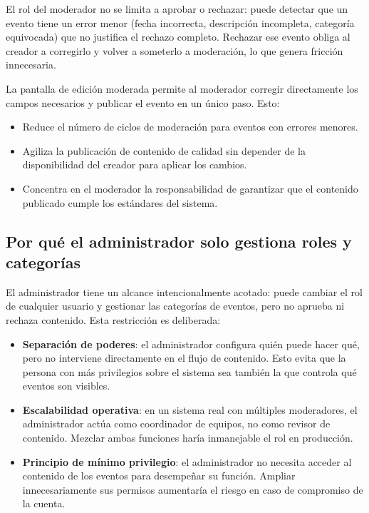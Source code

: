 El rol del moderador no se limita a aprobar o rechazar: puede detectar que un evento tiene un error menor (fecha incorrecta, descripción incompleta, categoría equivocada) que no justifica el rechazo completo. Rechazar ese evento obliga al creador a corregirlo y volver a someterlo a moderación, lo que genera fricción innecesaria.

La pantalla de edición moderada permite al moderador corregir directamente los campos necesarios y publicar el evento en un único paso. Esto:

\begin{itemize}
    \item Reduce el número de ciclos de moderación para eventos con errores menores.
    \item Agiliza la publicación de contenido de calidad sin depender de la disponibilidad del creador para aplicar los cambios.
    \item Concentra en el moderador la responsabilidad de garantizar que el contenido publicado cumple los estándares del sistema.
\end{itemize}

\subsection{Por qué el administrador solo gestiona roles y categorías}

El administrador tiene un alcance intencionalmente acotado: puede cambiar el rol de cualquier usuario y gestionar las categorías de eventos, pero no aprueba ni rechaza contenido. Esta restricción es deliberada:

\begin{itemize}
    \item \textbf{Separación de poderes}: el administrador configura quién puede hacer qué, pero no interviene directamente en el flujo de contenido. Esto evita que la persona con más privilegios sobre el sistema sea también la que controla qué eventos son visibles.
    \item \textbf{Escalabilidad operativa}: en un sistema real con múltiples moderadores, el administrador actúa como coordinador de equipos, no como revisor de contenido. Mezclar ambas funciones haría inmanejable el rol en producción.
    \item \textbf{Principio de mínimo privilegio}: el administrador no necesita acceder al contenido de los eventos para desempeñar su función. Ampliar innecesariamente sus permisos aumentaría el riesgo en caso de compromiso de la cuenta.
\end{itemize}

